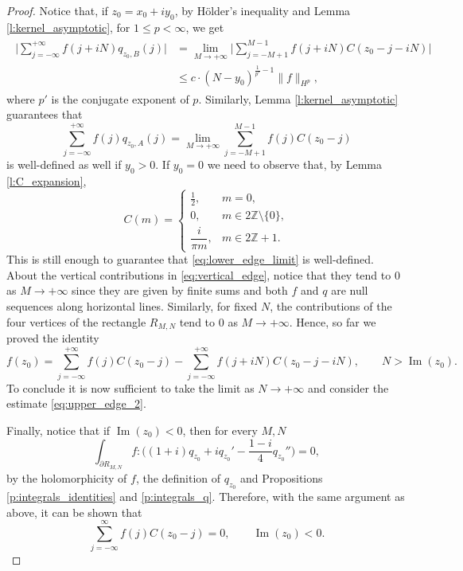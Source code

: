 \documentclass[12pt,a4paper,reqno]{amsart}
\theoremstyle{definition}
\theoremstyle{definition}\newtheorem{defn}[thm]{Definition}
\begin{document}
\begin{proof}
    
    Notice that, if $z_0=x_0+iy_0$, by H\"older's inequality and Lemma \ref{l:kernel_asymptotic}, for $1\leqslant p<\infty$, we get
    \begin{align}\label{eq:upper_edge_2}
    \begin{split}
     \Big|\sum_{j=-\infty}^{+\infty}f(j+iN)q_{z_0,B}(j)\Big|&= \lim_{M\to+\infty}\Big|\sum_{j=-M+1}^{M-1}f(j+iN)C(z_0-j-iN)\Big|\\
     &\leqslant c \cdot (N-y_0)^{\frac 1{p'}-1}\|f\|_{H^p},
     \end{split}
    \end{align}
    where $p'$ is the conjugate exponent of $p$.
    Similarly, Lemma \ref{l:kernel_asymptotic} guarantees that 
    \begin{equation}\label{eq:lower_edge_limit}
    \sum_{j=-\infty}^{+\infty}f(j)q_{z_0,A}(j)=\lim_{M\to+\infty} \sum_{j=-M+1}^{M-1} f(j)C(z_0-j)
    \end{equation}
    is well-defined as well if $y_0>0$. If $y_0=0$ we need to observe that, by Lemma \ref{l:C_expansion},
    \begin{equation*}
    C(m)=
    \begin{cases}
    \frac12, & m=0,\\[4pt]
    0, & m\in 2\mathbb Z\setminus\{0\},\\[4pt]
    \dfrac{i}{\pi m}, & m\in 2\mathbb Z+1.
    \end{cases}
    \end{equation*}
    This is still enough to guarantee that \eqref{eq:lower_edge_limit} is well-defined. About the vertical contributions in \eqref{eq:vertical_edge}, notice that they tend to $0$ as $M\to+\infty$ since they are given by finite sums and both $f$ and $q$ are null sequences along horizontal lines.  Similarly, for fixed $N$, the contributions of the four vertices of the rectangle $R_{M,N}$ tend to $0$ as $M\to+\infty$. Hence, so far we proved the identity
    \[
    f(z_0) =\sum_{j=-\infty}^{+\infty} f(j)C(z_0-j)-\sum_{j=-\infty}^{+\infty} f(j+iN)C(z_0-j-iN), \qquad N> \operatorname{Im}(z_0).
    \] 
    To conclude it is now sufficient to take the limit as $N\to+\infty$ and consider the estimate \eqref{eq:upper_edge_2}.
    
    
    Finally, notice that if $\operatorname{Im}(z_0)<0$, then for every $M,N$
    \[
    \int_{\partial R_{M,N}} f:\big((1+i)q_{z_0}+iq_{z_0}'-\frac{1-i}{4}q_{z_0}''\big) =0,
    \]
    by the holomorphicity of $f$, the definition of $q_{z_0}$ and Propositions \ref{p:integrals_identities} and \ref{p:integrals_q}. Therefore, with the same argument as above, it can be shown that
    \[
    \sum_{j=-\infty}^{\infty} f(j)C(z_0-j)=0, \qquad \operatorname{Im}(z_0)<0.
    \]
    \end{proof}
    
\end{document}
